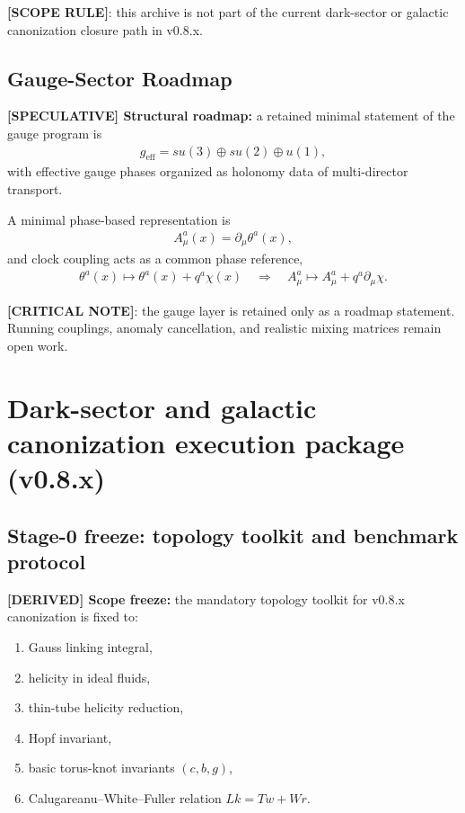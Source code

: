 \textbf{[SCOPE RULE]}: this archive is not part of the current dark-sector or galactic canonization closure path in v0.8.x.

\subsection{Gauge-Sector Roadmap}
\textbf{[SPECULATIVE] Structural roadmap:} a retained minimal statement of the gauge program is
\begin{align}
    g_{\mathrm{eff}} = su(3) \oplus su(2) \oplus u(1),
\end{align}
with effective gauge phases organized as holonomy data of multi-director transport.

A minimal phase-based representation is
\begin{align}
    A^a_{\mu}(x) = \partial_{\mu}\theta^a(x),
\end{align}
and clock coupling acts as a common phase reference,
\begin{align}
    \theta^a(x) \mapsto \theta^a(x)+q^a\chi(x)
    \quad\Rightarrow\quad
    A^a_{\mu}\mapsto A^a_{\mu}+q^a\partial_{\mu}\chi.
\end{align}

\textbf{[CRITICAL NOTE]}: the gauge layer is retained only as a roadmap statement. Running couplings, anomaly cancellation, and realistic mixing matrices remain open work.

\section{Dark-sector and galactic canonization execution package (v0.8.x)}
\label{sec:dark-sector-execution-package}

\subsection{Stage-0 freeze: topology toolkit and benchmark protocol}
\textbf{[DERIVED] Scope freeze:} the mandatory topology toolkit for v0.8.x canonization is fixed to:
\begin{enumerate}
    \item Gauss linking integral,
    \item helicity in ideal fluids,
    \item thin-tube helicity reduction,
    \item Hopf invariant,
    \item basic torus-knot invariants $(c,b,g)$,
    \item Calugareanu--White--Fuller relation $Lk=Tw+Wr$.
\end{enumerate}

